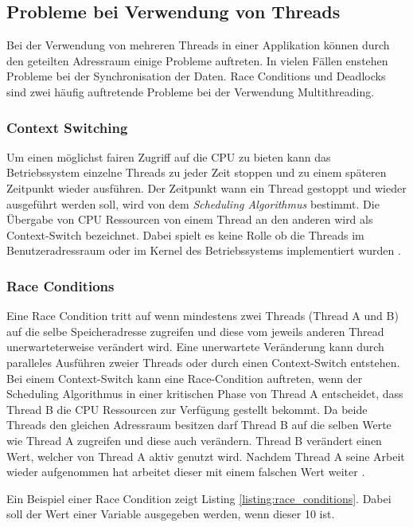 \subsection{Probleme bei Verwendung von Threads}
Bei der Verwendung von mehreren Threads in einer Applikation können durch den geteilten Adressraum einige Probleme auftreten. In vielen Fällen enstehen Probleme bei der Synchronisation der Daten. Race Conditions und Deadlocks sind zwei häufig auftretende Probleme bei der Verwendung Multithreading. 

\subsubsection{Context Switching}
Um einen möglichst fairen Zugriff auf die CPU zu bieten kann das Betriebssystem einzelne Threads zu jeder Zeit stoppen und zu einem späteren Zeitpunkt wieder ausführen. Der Zeitpunkt wann ein Thread gestoppt und wieder ausgeführt werden soll, wird von dem \emph{Scheduling Algorithmus} bestimmt. Die Übergabe von CPU Ressourcen von einem Thread an den anderen wird als Context-Switch bezeichnet. Dabei spielt es keine Rolle ob die Threads im Benutzeradressraum oder im Kernel des Betriebssystems implementiert wurden \cite[p. 23]{Sto2013}.

\subsubsection{Race Conditions}

Eine Race Condition tritt auf wenn mindestens zwei Threads (Thread A und B) auf die selbe Speicheradresse zugreifen und diese vom jeweils anderen Thread unerwarteterweise verändert wird. Eine unerwartete Veränderung kann durch paralleles Ausführen zweier Threads oder durch einen Context-Switch entstehen. Bei einem Context-Switch kann eine Race-Condition auftreten, wenn der Scheduling Algorithmus in einer kritischen Phase von Thread A entscheidet, dass Thread B die CPU Ressourcen zur Verfügung gestellt bekommt. Da beide Threads den gleichen Adressraum besitzen darf Thread B auf die selben Werte wie Thread A zugreifen und diese auch verändern.  Thread B verändert einen Wert, welcher von Thread A aktiv genutzt wird. Nachdem Thread A seine Arbeit wieder aufgenommen hat arbeitet dieser mit einem falschen Wert weiter \cite[p. 89]{tan09}. 

Ein Beispiel einer Race Condition zeigt Listing \ref{listing:race_conditions}. Dabei soll der Wert einer Variable ausgegeben werden, wenn dieser 10 ist.

